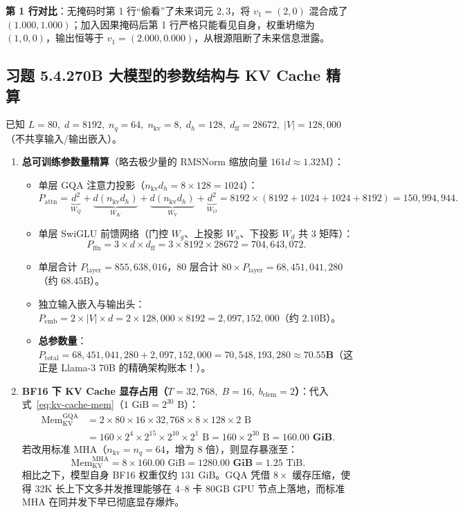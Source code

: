 \textbf{第 1 行对比}：无掩码时第 1 行“偷看”了未来词元 $2, 3$，将 $v_1=(2,0)$ 混合成了 $(1.000, 1.000)$；加入因果掩码后第 1 行严格只能看见自身，权重坍缩为 $(1,0,0)$，输出恒等于 $v_1 = (2.000, 0.000)$，从根源阻断了未来信息泄露。

\subsection*{习题 5.4.2\quad 70B 大模型的参数结构与 KV Cache 精算}
已知 $L = 80,\; d = 8192,\; n_q = 64,\; n_{\text{kv}} = 8,\; d_h = 128,\; d_{\text{ff}} = 28672,\; |V| = 128{,}000$（不共享输入/输出嵌入）。
\begin{enumerate}[label=(\alph*), leftmargin=1.8em]
  \item \textbf{总可训练参数量精算}（略去极少量的 RMSNorm 缩放向量 $161 d \approx 1.32\text{M}$）：
  \begin{itemize}
    \item 单层 GQA 注意力投影（$n_{\text{kv}} d_h = 8 \times 128 = 1024$）：
    \[
      P_{\text{attn}} = \underbrace{d^2}_{W_Q} + \underbrace{d(n_{\text{kv}} d_h)}_{W_K} + \underbrace{d(n_{\text{kv}} d_h)}_{W_V} + \underbrace{d^2}_{W_O}
      = 8192 \times (8192 + 1024 + 1024 + 8192) = 150{,}994{,}944.
    \]
    \item 单层 SwiGLU 前馈网络（门控 $W_g$、上投影 $W_u$、下投影 $W_d$ 共 3 矩阵）：
    \[
      P_{\text{ffn}} = 3 \times d \times d_{\text{ff}} = 3 \times 8192 \times 28672 = 704{,}643{,}072.
    \]
    \item 单层合计 $P_{\text{layer}} = 855{,}638{,}016$，80 层合计 $80 \times P_{\text{layer}} = 68{,}451{,}041{,}280$（约 $68.45\text{B}$）。
    \item 独立输入嵌入与输出头：$P_{\text{emb}} = 2 \times |V| \times d = 2 \times 128{,}000 \times 8192 = 2{,}097{,}152{,}000$（约 $2.10\text{B}$）。
    \item \textbf{总参数量}：$P_{\text{total}} = 68{,}451{,}041{,}280 + 2{,}097{,}152{,}000 = 70{,}548{,}193{,}280 \approx \mathbf{70.55\text{B}}$（这正是 Llama-3 70B 的精确架构账本！）。
  \end{itemize}

  \item \textbf{BF16 下 KV Cache 显存占用（$T = 32{,}768,\; B = 16,\; b_{\text{elem}} = 2$）}：代入式~\eqref{eq:kv-cache-mem}（$1\text{ GiB} = 2^{30}\text{ B}$）：
  \begin{align*}
    \text{Mem}_{\mathrm{KV}}^{\mathrm{GQA}}
    &= 2 \times 80 \times 16 \times 32{,}768 \times 8 \times 128 \times 2\text{ B} \\
    &= 160 \times 2^{4} \times 2^{15} \times 2^{10} \times 2^{1}\text{ B}
     = 160 \times 2^{30}\text{ B} = \mathbf{160.00\text{ GiB}}.
  \end{align*}
  若改用标准 MHA（$n_{\text{kv}} = n_q = 64$，增为 $8$ 倍），则显存暴涨至：
  \[
    \text{Mem}_{\mathrm{KV}}^{\mathrm{MHA}} = 8 \times 160.00\text{ GiB} = \mathbf{1280.00\text{ GiB}} = 1.25\text{ TiB}.
  \]
  相比之下，模型自身 BF16 权重仅约 $131\text{ GiB}$。GQA 凭借 $8\times$ 缓存压缩，使得 32K 长上下文多并发推理能够在 4--8 卡 80GB GPU 节点上落地，而标准 MHA 在同并发下早已彻底显存爆炸。
\end{enumerate}

